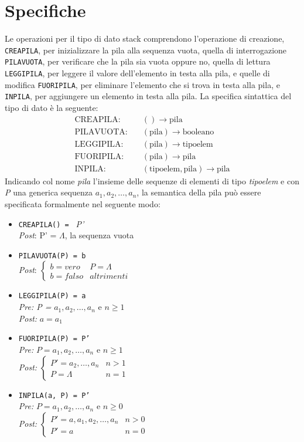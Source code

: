 \documentclass[12pt]{report}
\begin{document}
	\section{Specifiche}
	Le operazioni per il tipo di dato stack comprendono l'operazione di creazione, \texttt{CREAPILA}, per inizializzare la pila alla sequenza vuota, quella di interrogazione \texttt{PILAVUOTA}, per verificare che la pila sia vuota oppure no, quella di lettura \texttt{LEGGIPILA}, per leggere il valore dell'elemento in testa alla pila, e quelle di modifica \texttt{FUORIPILA}, per eliminare l'elemento che si trova in testa alla pila, e \texttt{INPILA}, per aggiungere un elemento in testa alla pila. La specifica sintattica del tipo di dato è la seguente:
	\begin{align*}
		\text{CREAPILA:} &\quad () \to \text{pila} \\
		\text{PILAVUOTA:} &\quad (\text{pila}) \to \text{booleano} \\
		\text{LEGGIPILA:} &\quad (\text{pila}) \to \text{tipoelem} \\
		\text{FUORIPILA:} &\quad (\text{pila}) \to \text{pila} \\
		\text{INPILA:} &\quad (\text{tipoelem}, \text{pila}) \to \text{pila}
	\end{align*}
	Indicando col nome \textit{pila} l'insieme delle sequenze di elementi di tipo \textit{tipoelem} e con \textit{P} una generica sequenza $a_1, a_2, \dots, a_n$, la semantica della pila può essere specificata formalmente nel seguente modo:
	\begin{itemize}
		\item \texttt{CREAPILA() = } \textit{P'} \\
		\quad \textit{Post}: P' = $\Lambda$, la sequenza vuota
		\item \texttt{PILAVUOTA(P) = b} \\
		\quad \textit{Post}: $\begin{cases}
			b = vero & P = \Lambda \\
			b = falso & altrimenti
		\end{cases}$
		\item \texttt{LEGGIPILA(P) = a} \\
		\quad \textit{Pre: P = } $a_1, a_2, \dots, a_n$ e $n \geq 1$ \\
		\quad \textit{Post:} $a = a_1$
		\item \texttt{FUORIPILA(P) = P'} \\
		\quad \textit{Pre:} $P = a_1, a_2, \dots, a_n$ e $n \geq 1$ \\
		\quad \textit{Post:} $\begin{cases}
			P' = a_2, \dots, a_n & n > 1 \\
			P = \Lambda & n = 1
		\end{cases}$
		\item \texttt{INPILA(a, P) = P'} \\
		\quad \textit{Pre:} $P = a_1, a_2, \dots, a_n$ e $n \geq 0$ \\
		\quad \textit{Post:} $\begin{cases}
			P'= a, a_1, a_2, \dots, a_n & n > 0 \\
			P'= a & n = 0
		\end{cases}$
	\end{itemize}
\end{document}
